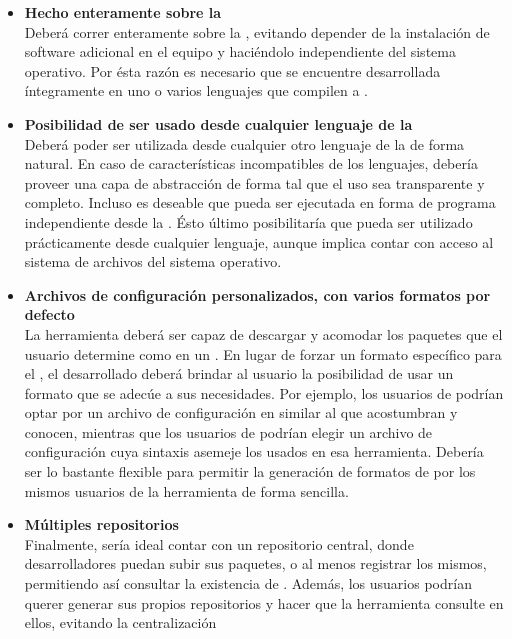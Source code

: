 \begin{itemize}
	\setlength{\itemsep}{1pt}
	\setlength{\parskip}{0pt}
	\setlength{\parsep}{0pt}
	\item \textbf{Hecho enteramente sobre la \jvm}\\
		Deberá correr enteramente sobre la \jvm, evitando depender de la 
		instalación de software adicional en el equipo y haciéndolo 
		independiente del sistema operativo. Por ésta razón es necesario que se 
		encuentre desarrollada  íntegramente en uno o varios lenguajes que 
		compilen a \bytecode \java.  
	\item \textbf{Posibilidad de ser usado desde cualquier lenguaje de 
	la \jvm}\\
		Deberá poder ser utilizada desde cualquier otro lenguaje de la \jvm de 
		forma natural. En caso de características incompatibles de los 
		lenguajes, debería proveer una capa de abstracción de forma tal que el 
		uso sea transparente y completo. Incluso es deseable que pueda ser 
		ejecutada en forma de programa independiente desde la \cli. Ésto último 
		posibilitaría que pueda ser utilizado prácticamente desde cualquier 
		lenguaje, aunque implica contar con acceso al sistema de archivos del 
		sistema operativo.
	\item \textbf{Archivos de configuración personalizados, con varios 
	formatos por defecto}\\
		La herramienta deberá ser capaz de descargar y acomodar los paquetes 
		que el usuario determine como \dependencies en un \conffile. En lugar 
		de forzar un formato específico para el \conffile, el \depmgr 
		desarrollado deberá brindar al usuario la posibilidad de usar un 
		formato que se adecúe a sus necesidades. Por ejemplo, los usuarios de 
		\apache \maven podrían optar por un archivo de configuración en \xml 
		similar al que acostumbran y conocen, mientras que los usuarios de \sbt 
		podrían elegir un archivo de configuración cuya sintaxis asemeje los 
		usados en esa herramienta. Debería ser lo bastante flexible para 
		permitir la generación de formatos de \conffile por los mismos usuarios 
		de la herramienta de forma sencilla.
	\item \textbf{Múltiples repositorios}\\
		Finalmente, sería ideal contar con un repositorio central, donde 
		desarrolladores puedan subir sus paquetes, o al menos registrar los 
		mismos, permitiendo así consultar la existencia de \dependencies. 
		Además, los usuarios podrían querer generar sus propios repositorios y 
		hacer que la herramienta consulte en ellos, evitando la centralización 

\end{itemize}
